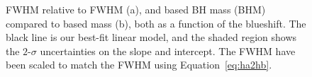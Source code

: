 \begin{figure}
    \captionsetup[subfigure]{labelformat=empty}
    \centering
    \subfloat[\label{fig:correction_ha_a}]{}
    \subfloat[\label{fig:correction_ha_b}]{}
    \caption[{ FWHM relative to \ha FWHM and  based BH mass compared to \ha based mass, both as a function of the  blueshift.}]{ FWHM relative to \ha FWHM (a), and  based BH mass (BHM) compared to \ha based mass (b), both as a function of the  blueshift. The black line is our best-fit linear model, and the shaded region shows the $2$-$\sigma$ uncertainties on the slope and intercept. The \ha FWHM have been scaled to match the \hb FWHM using Equation~\ref{eq:ha2hb}.}
    \label{fig:correction_ha}
\end{figure}

